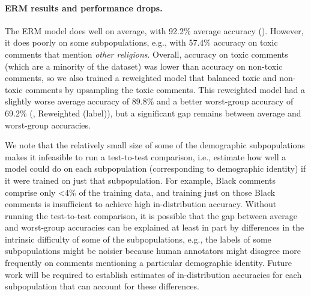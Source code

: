 \paragraph{ERM results and performance drops.}
The ERM model does well on average, with 92.2\% average accuracy (). However, it does poorly on some subpopulations, e.g., with 57.4\% accuracy on toxic comments that mention \textit{other religions}.
Overall, accuracy on toxic comments (which are a minority of the dataset) was lower than accuracy on non-toxic comments, so we also trained a reweighted model that balanced toxic and non-toxic comments by upsampling the toxic comments. This reweighted model had a slightly worse average accuracy of 89.8\% and a better worst-group accuracy of 69.2\% (, Reweighted (label)), but a significant gap remains between average and worst-group accuracies.

We note that the relatively small size of some of the demographic subpopulations makes it infeasible to run a test-to-test comparison, i.e., estimate how well a model could do on each subpopulation (corresponding to demographic identity) if it were trained on just that subpopulation.
For example, Black comments comprise only \textless 4\% of the training data,
and training just on those Black comments is insufficient to achieve high in-distribution accuracy.
Without running the test-to-test comparison, it is possible that the gap between average and worst-group accuracies can be explained at least in part by differences in the intrinsic difficulty of some of the subpopulations, e.g., the labels of some subpopulations might be noisier because human annotators might disagree more frequently on comments mentioning a particular demographic identity.
Future work will be required to establish estimates of in-distribution accuracies for each subpopulation that can account for these differences.

